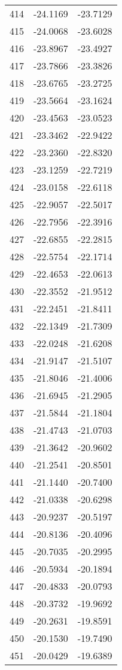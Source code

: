 \documentclass{article}
\begin{document}
\begin{longtable}{|c|c|c|}
414 & -24.1169 & -23.7129 \\
415 & -24.0068 & -23.6028 \\
416 & -23.8967 & -23.4927 \\
417 & -23.7866 & -23.3826 \\
418 & -23.6765 & -23.2725 \\
419 & -23.5664 & -23.1624 \\
420 & -23.4563 & -23.0523 \\
421 & -23.3462 & -22.9422 \\
422 & -23.2360 & -22.8320 \\
423 & -23.1259 & -22.7219 \\
424 & -23.0158 & -22.6118 \\
425 & -22.9057 & -22.5017 \\
426 & -22.7956 & -22.3916 \\
427 & -22.6855 & -22.2815 \\
428 & -22.5754 & -22.1714 \\
429 & -22.4653 & -22.0613 \\
430 & -22.3552 & -21.9512 \\
431 & -22.2451 & -21.8411 \\
432 & -22.1349 & -21.7309 \\
433 & -22.0248 & -21.6208 \\
434 & -21.9147 & -21.5107 \\
435 & -21.8046 & -21.4006 \\
436 & -21.6945 & -21.2905 \\
437 & -21.5844 & -21.1804 \\
438 & -21.4743 & -21.0703 \\
439 & -21.3642 & -20.9602 \\
440 & -21.2541 & -20.8501 \\
441 & -21.1440 & -20.7400 \\
442 & -21.0338 & -20.6298 \\
443 & -20.9237 & -20.5197 \\
444 & -20.8136 & -20.4096 \\
445 & -20.7035 & -20.2995 \\
446 & -20.5934 & -20.1894 \\
447 & -20.4833 & -20.0793 \\
448 & -20.3732 & -19.9692 \\
449 & -20.2631 & -19.8591 \\
450 & -20.1530 & -19.7490 \\
451 & -20.0429 & -19.6389 \\

\end{longtable}
\end{document}
